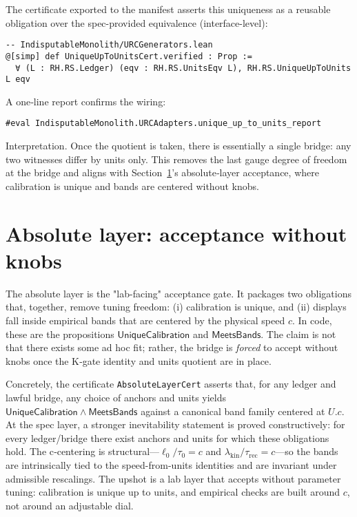 \documentclass[11pt,a4paper,twoside]{article}
\numberwithin{equation}{section}
\theoremstyle{customthm}
\theoremstyle{customdef}
\theoremstyle{customrem}
\begin{document}
The certificate exported to the manifest asserts this uniqueness as a reusable obligation over the spec-provided equivalence (interface-level):
\begin{lstlisting}
-- IndisputableMonolith/URCGenerators.lean
@[simp] def UniqueUpToUnitsCert.verified : Prop :=
  ∀ (L : RH.RS.Ledger) (eqv : RH.RS.UnitsEqv L), RH.RS.UniqueUpToUnits L eqv
\end{lstlisting}

A one‐line report confirms the wiring:
\begin{lstlisting}
#eval IndisputableMonolith.URCAdapters.unique_up_to_units_report
\end{lstlisting}

Interpretation. Once the quotient is taken, there is essentially a single bridge: any two witnesses differ by units only. This removes the last gauge degree of freedom at the bridge and aligns with Section~\ref{sec:absolute}'s absolute‐layer acceptance, where calibration is unique and bands are centered without knobs.

\section{Absolute layer: acceptance without knobs}\label{sec:absolute}

The absolute layer is the "lab-facing" acceptance gate. It packages two obligations that, together, remove tuning freedom: (i) calibration is unique, and (ii) displays fall inside empirical bands that are centered by the physical speed \(c\). In code, these are the propositions \(\mathsf{UniqueCalibration}\) and \(\mathsf{MeetsBands}\). The claim is not that there exists some ad hoc fit; rather, the bridge is \emph{forced} to accept without knobs once the K‑gate identity and units quotient are in place. 

Concretely, the certificate \texttt{AbsoluteLayerCert} asserts that, for any ledger and lawful bridge, any choice of anchors and units yields \(\mathsf{UniqueCalibration}\wedge\mathsf{MeetsBands}\) against a canonical band family centered at \(U.c\). At the spec layer, a stronger inevitability statement is proved constructively: for every ledger/bridge there exist anchors and units for which these obligations hold. The c‑centering is structural—\(\ell_0/\tau_0 = c\) and \(\lambda_{\mathrm{kin}}/\tau_{\mathrm{rec}} = c\)—so the bands are intrinsically tied to the speed-from-units identities and are invariant under admissible rescalings. The upshot is a lab layer that accepts without parameter tuning: calibration is unique up to units, and empirical checks are built around \(c\), not around an adjustable dial.
\end{document}
